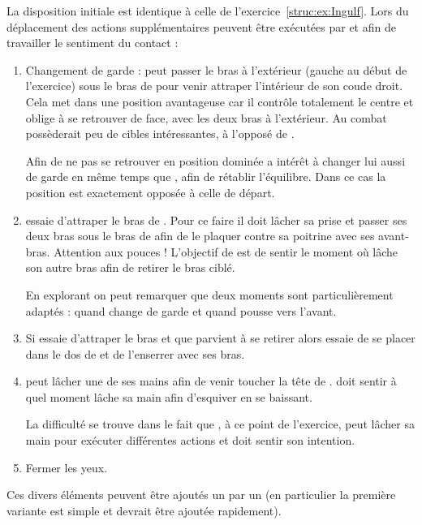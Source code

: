 \begin{exercice}
\label{att:ex:Ingulf-variantes}


La disposition initiale est identique à celle de l'exercice~\ref{struc:ex:Ingulf}.
Lors du déplacement des actions supplémentaires peuvent être exécutées par \A et \D afin de travailler le sentiment du contact :
\begin{enumerate}
	\item Changement de garde : \A peut passer le bras à l'extérieur (gauche au début de l'exercice) sous le bras de \D pour venir attraper l'intérieur de son coude droit.
	Cela met \A dans une position avantageuse car il contrôle totalement le centre et oblige \D à se retrouver de face, avec les deux bras à l'extérieur.
	Au combat \D possèderait peu de cibles intéressantes, à l'opposé de \A.
	
	Afin de ne pas se retrouver en position dominée \D a intérêt à changer lui aussi de garde en même temps que \A, afin de rétablir l'équilibre.
	Dans ce cas la position est exactement opposée à celle de départ.
	
	\item \A essaie d'attraper le bras de \D.
	Pour ce faire il doit lâcher sa prise et passer ses deux bras sous le bras de \D afin de le plaquer contre sa poitrine avec ses avant-bras.
	Attention aux pouces !
	L'objectif de \D est de sentir le moment où \A lâche son autre bras afin de retirer le bras ciblé.
	
	En explorant on peut remarquer que deux moments sont particulièrement adaptés : quand \D change de garde et quand \D pousse vers l'avant.
	
	\item Si \A essaie d'attraper le bras et que \D parvient à se retirer alors \D essaie de se placer dans le dos de \A et de l'enserrer avec ses bras.
	
	\item \A peut lâcher une de ses mains afin de venir toucher la tête de \D.
	\D doit sentir à quel moment \A lâche sa main afin d'esquiver en se baissant.
	
	La difficulté se trouve dans le fait que \A, à ce point de l'exercice, \A peut lâcher sa main pour exécuter différentes actions et \D doit sentir son intention.
	
	\item Fermer les yeux.
\end{enumerate}
Ces divers éléments peuvent être ajoutés un par un (en particulier la première variante est simple et devrait être ajoutée rapidement).

\end{exercice}

